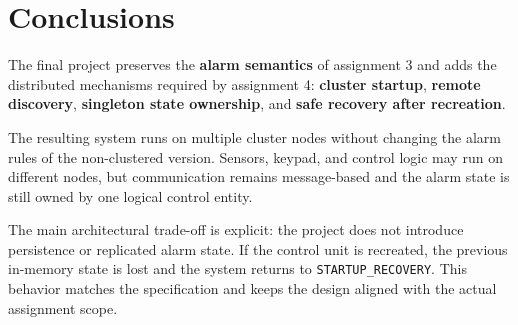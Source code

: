 \clearpage
\section{Conclusions}

The final project preserves the \textbf{alarm semantics} of assignment 3 and adds
the distributed mechanisms required by assignment 4: \textbf{cluster startup},
\textbf{remote discovery}, \textbf{singleton state ownership}, and \textbf{safe
recovery after recreation}.

The resulting system runs on multiple cluster nodes without changing the alarm
rules of the non-clustered version. Sensors, keypad, and control logic may run
on different nodes, but communication remains message-based and the alarm state
is still owned by one logical control entity.

The main architectural trade-off is explicit: the project does not introduce
persistence or replicated alarm state. If the control unit is recreated, the
previous in-memory state is lost and the system returns to
\texttt{STARTUP\_RECOVERY}. This behavior matches the specification and keeps the
design aligned with the actual assignment scope.
